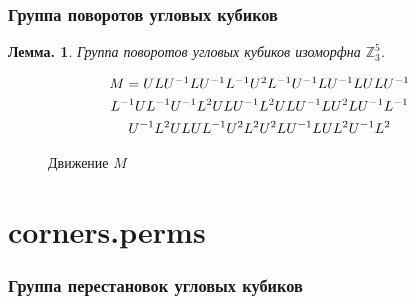 \documentclass[utf8,russian]{beamer}
\newtheorem{ru_theo}{Лемма.}
\renewenvironment{theorem}{\begin{ru_theo}}{\end{ru_theo}}
\begin{document}

\begin{frame}
\frametitle{Группа поворотов угловых кубиков}
\begin{theorem}
Группа поворотов угловых кубиков изоморфна $\mathbb{Z}_3^5$.
\end{theorem}
\begin{multline*}
$$
M = ULU^{-1}LU^{-1}L^{-1}U^2L^{-1}U^{-1}LU^{-1}LULU^{-1}       \\
L^{-1}UL^{-1}U^{-1}L^2ULU^{-1}L^2ULU^{-1}LU^2LU^{-1}L^{-1} \\
U^{-1}L^2ULUL^{-1}U^2L^2U^2LU^{-1}LUL^2U^{-1}L^2
$$
\end{multline*}
\begin{figure}
	\RubikCubeSolved
	\caption{Движение $M$}
\end{figure}
\end{frame}

\section{corners.perms}

\begin{frame}
\frametitle{Группа перестановок угловых кубиков}
\RubikCubeSolved
{}
\begin{figure}
\end{figure}
\end{frame}
\end{document}
